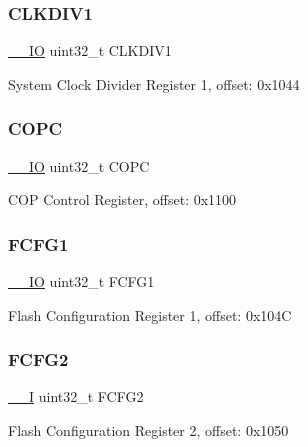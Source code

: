 \subsubsection{\texorpdfstring{CLKDIV1}{CLKDIV1}}
{\footnotesize\ttfamily \mbox{\hyperlink{core__cm0plus_8h_aec43007d9998a0a0e01faede4133d6be}{\+\_\+\+\_\+\+IO}} uint32\+\_\+t C\+L\+K\+D\+I\+V1}

System Clock Divider Register 1, offset\+: 0x1044 \mbox{\label{struct_s_i_m___type_aa35d8ef46eb486a961d6a3c4d5b3441f}} 
\subsubsection{\texorpdfstring{COPC}{COPC}}
{\footnotesize\ttfamily \mbox{\hyperlink{core__cm0plus_8h_aec43007d9998a0a0e01faede4133d6be}{\+\_\+\+\_\+\+IO}} uint32\+\_\+t C\+O\+PC}

C\+OP Control Register, offset\+: 0x1100 \mbox{\label{struct_s_i_m___type_a1b5282422d8bb162cd742775e5f9864f}} 
\subsubsection{\texorpdfstring{FCFG1}{FCFG1}}
{\footnotesize\ttfamily \mbox{\hyperlink{core__cm0plus_8h_aec43007d9998a0a0e01faede4133d6be}{\+\_\+\+\_\+\+IO}} uint32\+\_\+t F\+C\+F\+G1}

Flash Configuration Register 1, offset\+: 0x104C \mbox{\label{struct_s_i_m___type_a48581edecb6a9421e0e159dca5bf8c8c}} 
\subsubsection{\texorpdfstring{FCFG2}{FCFG2}}
{\footnotesize\ttfamily \mbox{\hyperlink{core__cm0plus_8h_af63697ed9952cc71e1225efe205f6cd3}{\+\_\+\+\_\+I}} uint32\+\_\+t F\+C\+F\+G2}

Flash Configuration Register 2, offset\+: 0x1050 \mbox{\label{struct_s_i_m___type_a342559d79209f064052a8a005bfd38a3}} 
